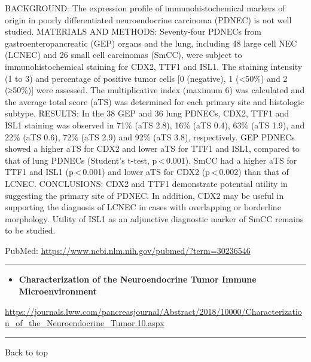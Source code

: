\documentclass[]{article}
\providecommand{\tightlist}{%
  \setlength{\itemsep}{0pt}\setlength{\parskip}{0pt}}
\begin{document}
BACKGROUND: The expression profile of immunohistochemical markers of
origin in poorly differentiated neuroendocrine carcinoma (PDNEC) is not
well studied. MATERIALS AND METHODS: Seventy-four PDNECs from
gastroenteropancreatic (GEP) organs and the lung, including 48 large
cell NEC (LCNEC) and 26 small cell carcinomas (SmCC), were subject to
immunohistochemical staining for CDX2, TTF1 and ISL1. The staining
intensity (1 to 3) and percentage of positive tumor cells {[}0
(negative), 1 (\textless{}50\%) and 2 (≥50\%){]} were assessed. The
multiplicative index (maximum 6) was calculated and the average total
score (aTS) was determined for each primary site and histologic subtype.
RESULTS: In the 38 GEP and 36 lung PDNECs, CDX2, TTF1 and ISL1 staining
was observed in 71\% (aTS 2.8), 16\% (aTS 0.4), 63\% (aTS 1.9), and 22\%
(aTS 0.6), 72\% (aTS 2.9) and 92\% (aTS 3.8), respectively. GEP PDNECs
showed a higher aTS for CDX2 and lower aTS for TTF1 and ISL1, compared
to that of lung PDNECs (Student's t-test, p\,\textless{}\,0.001). SmCC
had a higher aTS for TTF1 and ISL1 (p\,\textless{}\,0.001) and lower aTS
for CDX2 (p\,\textless{}\,0.002) than that of LCNEC. CONCLUSIONS: CDX2
and TTF1 demonstrate potential utility in suggesting the primary site of
PDNEC. In addition, CDX2 may be useful in supporting the diagnosis of
LCNEC in cases with overlapping or borderline morphology. Utility of
ISL1 as an adjunctive diagnostic marker of SmCC remains to be studied.

PubMed: \url{https://www.ncbi.nlm.nih.gov/pubmed/?term=30236546}

{}

{}

\begin{center}\rule{0.5\linewidth}{\linethickness}\end{center}

\begin{itemize}
\tightlist
\item
  \textbf{Characterization of the Neuroendocrine Tumor Immune
  Microenvironment}
\end{itemize}

\url{https://journals.lww.com/pancreasjournal/Abstract/2018/10000/Characterization_of_the_Neuroendocrine_Tumor.10.aspx}

\begin{center}\rule{0.5\linewidth}{\linethickness}\end{center}

Back to top

\pagebreak
\end{document}
